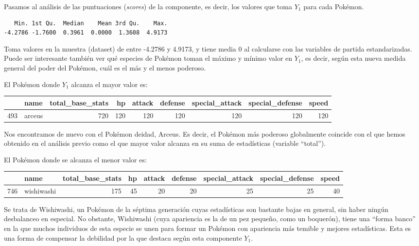 \documentclass[
  12pt,
]{extreport}
\begin{document}
Pasamos al análisis de las puntuaciones (\emph{scores}) de la
componente, es decir, los valores que toma \(Y_1\) para cada Pokémon.

\begin{verbatim}
   Min. 1st Qu.  Median    Mean 3rd Qu.    Max. 
-4.2786 -1.7600  0.3961  0.0000  1.3608  4.9173 
\end{verbatim}

Toma valores en la muestra (dataset) de entre -4.2786 y 4.9173, y tiene
media 0 al calcularse con las variables de partida estandarizadas. Puede
ser interesante también ver qué especies de Pokémon toman el máximo y
mínimo valor en \(Y_1\), es decir, según esta nueva medida general del
poder del Pokémon, cuál es el más y el menos poderoso.

El Pokémon donde \(Y_1\) alcanza el mayor valor es:

\begin{table}[H]
\centering\begingroup\fontsize{9.5}{11.5}\selectfont

\begin{tabular}{llrrrrrrr}
\toprule
  & name & total\_base\_stats & hp & attack & defense & special\_attack & special\_defense & speed\\
\midrule
493 & arceus & 720 & 120 & 120 & 120 & 120 & 120 & 120\\
\bottomrule
\end{tabular}
\endgroup{}
\end{table}

Nos encontramos de nuevo con el Pokémon deidad, Arceus. Es decir, el
Pokémon más poderoso globalmente coincide con el que hemos obtenido en
el análisis previo como el que mayor valor alcanza en su suma de
estadísticas (variable ``total'').

El Pokémon donde se alcanza el menor valor es:

\begin{table}[H]
\centering\begingroup\fontsize{9.5}{11.5}\selectfont

\begin{tabular}{llrrrrrrr}
\toprule
  & name & total\_base\_stats & hp & attack & defense & special\_attack & special\_defense & speed\\
\midrule
746 & wishiwashi & 175 & 45 & 20 & 20 & 25 & 25 & 40\\
\bottomrule
\end{tabular}
\endgroup{}
\end{table}

Se trata de Wishiwashi, un Pokémon de la séptima generación cuyas
estadísticas son bastante bajas en general, sin haber ningún desbalanceo
en especial. No obstante, Wishiwashi (cuya apariencia es la de un pez
pequeño, como un boquerón), tiene una ``forma banco'' en la que muchos
individuos de esta especie se unen para formar un Pokémon con apariencia
más temible y mejores estadísticas. Esta es una forma de compensar la
debilidad por la que destaca según esta componente \(Y_1\).
\end{document}
